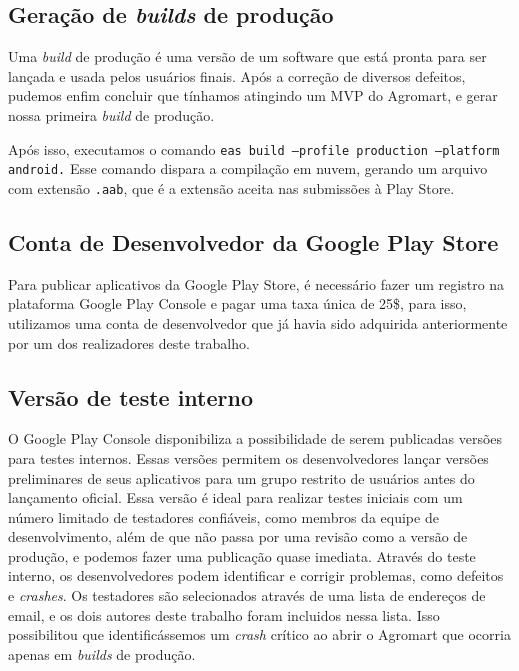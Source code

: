 \subsection{Geração de \textit{builds} de produção}

Uma \textit{build} de produção é uma versão de um software que está pronta para ser lançada e usada pelos usuários finais. Após a correção de diversos defeitos, pudemos enfim concluir que tínhamos atingindo um MVP do Agromart, e gerar nossa primeira \textit{build} de produção.

Após isso, executamos o comando \texttt{eas build  ---profile production  ---platform android.} Esse comando dispara a compilação em nuvem, gerando um arquivo com extensão \texttt{.aab}, que é a extensão aceita nas submissões à Play Store.

\subsection{Conta de Desenvolvedor da Google Play Store}
Para publicar aplicativos da Google Play Store, é necessário fazer um registro na plataforma Google Play Console e pagar uma taxa única de 25\$, para isso, utilizamos uma conta de desenvolvedor que já havia sido adquirida anteriormente por um dos realizadores deste trabalho.

\subsection{Versão de teste interno}
O Google Play Console disponibiliza a possibilidade de serem publicadas versões para testes internos. Essas versões permitem os desenvolvedores lançar versões preliminares de seus aplicativos para um grupo restrito de usuários antes do lançamento oficial. Essa versão é ideal para realizar testes iniciais com um número limitado de testadores confiáveis, como membros da equipe de desenvolvimento, além de que não passa por uma revisão como a versão de produção, e podemos fazer uma publicação quase imediata. Através do teste interno, os desenvolvedores podem identificar e corrigir problemas, como defeitos e \textit{crashes}. Os testadores são selecionados através de uma lista de endereços de email, e os dois autores deste trabalho foram incluidos nessa lista. Isso possibilitou que identificássemos um \textit{crash} crítico ao abrir o Agromart que ocorria apenas em \textit{builds} de produção.


